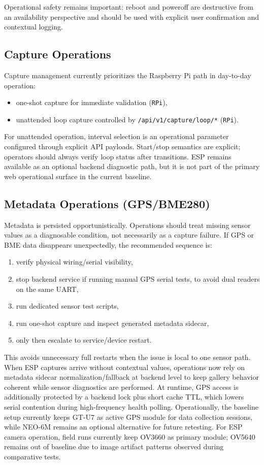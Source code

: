 Operational safety remains important: reboot and poweroff are destructive from an availability perspective and should be used with explicit user confirmation and contextual logging.


\subsection{Capture Operations}
Capture management currently prioritizes the Raspberry Pi path in day-to-day operation:
\begin{itemize}
  \item one-shot capture for immediate validation (\texttt{RPi}),
  \item unattended loop capture controlled by \texttt{/api/v1/capture/loop/*} (\texttt{RPi}).
\end{itemize}

For unattended operation, interval selection is an operational parameter configured through explicit API payloads. Start/stop semantics are explicit; operators should always verify loop status after transitions.
ESP remains available as an optional backend diagnostic path, but it is not part of the primary web operational surface in the current baseline.

\subsection{Metadata Operations (GPS/BME280)}
Metadata is persisted opportunistically. Operations should treat missing sensor values as a diagnosable condition, not necessarily as a capture failure. If GPS or BME data disappears unexpectedly, the recommended sequence is:
\begin{enumerate}
  \item verify physical wiring/serial visibility,
  \item stop backend service if running manual GPS serial tests, to avoid dual readers on the same UART,
  \item run dedicated sensor test scripts,
  \item run one-shot capture and inspect generated metadata sidecar,
  \item only then escalate to service/device restart.
\end{enumerate}

This avoids unnecessary full restarts when the issue is local to one sensor path.
When ESP captures arrive without contextual values, operations now rely on metadata sidecar normalization/fallback at backend level to keep gallery behavior coherent while sensor diagnostics are performed.
At runtime, GPS access is additionally protected by a backend lock plus short cache TTL, which lowers serial contention during high-frequency health polling.
Operationally, the baseline setup currently keeps GT-U7 as active GPS module for data collection sessions, while NEO-6M remains an optional alternative for future retesting.
For ESP camera operation, field runs currently keep OV3660 as primary module; OV5640 remains out of baseline due to image artifact patterns observed during comparative tests.

